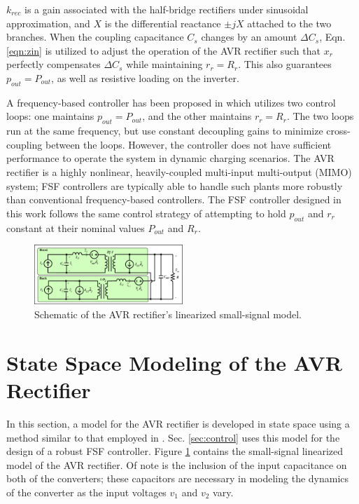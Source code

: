 \documentclass[conference, twocolumn, letterpaper]{IEEEtran}
\begin{document}
\normalsize

$k_{rec}$ is a gain associated with the half-bridge rectifiers under sinusoidal approximation, and $X$ is the differential reactance $\pm jX$ attached to the two branches. When the coupling capacitance $C_s$ changes by an amount $\Delta C_s$, Eqn. \ref{eqn:zin} is utilized to adjust the operation of the AVR rectifier such that $x_r$ perfectly compensates $\Delta C_s$ while maintaining $r_r = R_r$. This also guarantees $p_{out} = P_{out}$, as well as resistive loading on the inverter.

A frequency-based controller has been proposed in \cite{2024_Maji_COMPEL} which utilizes two control loops: one maintains $p_{out} = P_{out}$, and the other maintains $r_r = R_r$. The two loops run at the same frequency, but use constant decoupling gains to minimize cross-coupling between the loops. However, the controller does not have sufficient performance to operate the system in dynamic charging scenarios. The AVR rectifier is a highly nonlinear, heavily-coupled multi-input multi-output (MIMO) system; FSF controllers are typically able to handle such plants more robustly than conventional frequency-based controllers. The FSF controller designed in this work follows the same control strategy of attempting to hold $p_{out}$ and $r_r$ constant at their nominal values $P_{out}$ and $R_r$.

\begin{figure}[!ht]
	\centering
	\includegraphics[width=0.5\textwidth]{figures/avr_ss_model_schematic_eps.eps}
  	\caption{Schematic of the AVR rectifier's linearized small-signal model.}
  	\label{fig:small_signal}
	\vspace{-0.5cm}
\end{figure}

\vspace{0.5cm}

\section{State Space Modeling of the AVR Rectifier}
\label{sec:modeling}

In this section, a model for the AVR rectifier is developed in state space using a method similar to that employed in \cite{2010_Mayo_CONIELECOMP, 2004_Erickson}. Sec. \ref{sec:control} uses this model for the design of a robust FSF controller. Figure \ref{fig:small_signal} contains the small-signal linearized model of the AVR rectifier. Of note is the inclusion of the input capacitance on both of the converters; these capacitors are necessary in modeling the dynamics of the converter as the input voltages $v_1$ and $v_2$ vary.
\end{document}
